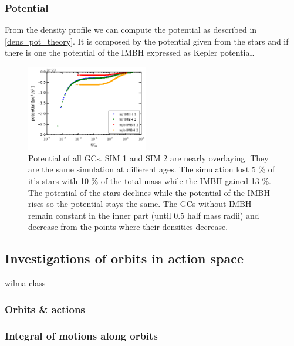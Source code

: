 \subsubsection{Potential}
From the density profile we can compute the potential as described in \ref{dens_pot_theory}. It is composed by the potential given from the stars and if there is one the potential of the \ac{IMBH} expressed as Kepler potential.
\begin{figure}
	\centering
	\includegraphics[width=0.475\textwidth]{Plots/Pot.pdf}
	\caption{Potential of all \acp{GC}. SIM 1 and SIM 2 are nearly overlaying. They are the same simulation at different ages. The simulation lost 5 \% of it's stars with 10 \% of the total mass while the \ac{IMBH} gained 13 \%. The potential of the stars declines while the potential of the \ac{IMBH} rises so the potential stays the same. The \acp{GC} without \ac{IMBH} remain constant in the inner part (until 0.5 half mass radii) and decrease from the points where their densities decrease.}
\end{figure}


\subsection{Investigations of orbits in action space}
wilma class 
\subsubsection{Orbits \& actions}


\subsubsection{Integral of motions along orbits}
